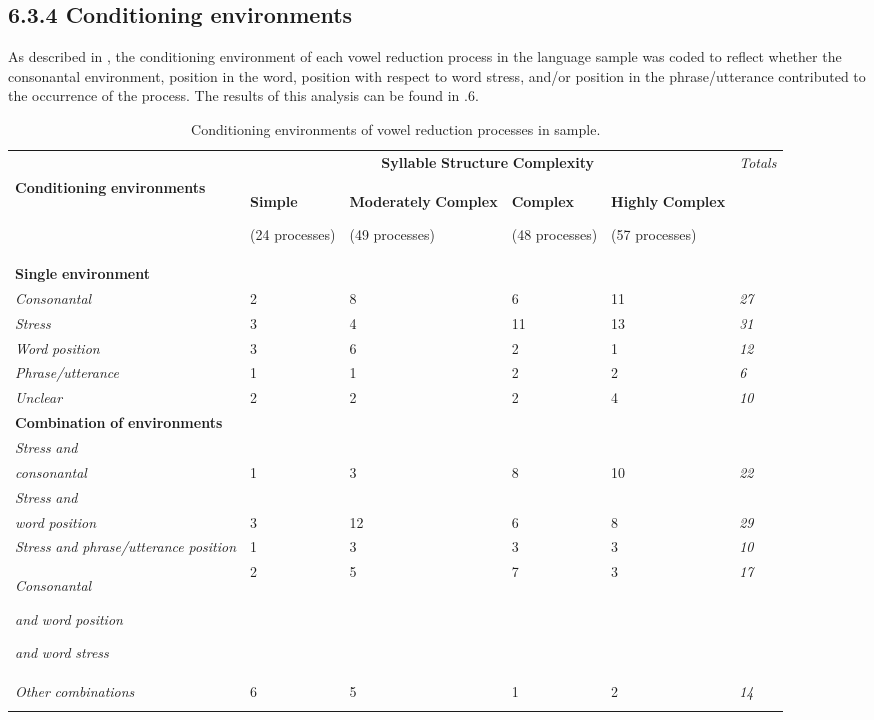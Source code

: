 \subsection{6.3.4 Conditioning environments}

  As described in , the conditioning environment of each vowel reduction process in the language sample was coded to reflect whether the consonantal environment, position in the word, position with respect to word stress, and/or position in the phrase/utterance contributed to the occurrence of the process. The results of this analysis can be found in .6.

\begin{table}
\begin{tabularx}{\textwidth}{XXXXXX}
\lsptoprule
 & \multicolumn{4}{c}{ \textbf{Syllable} \textbf{Structure} \textbf{Complexity}} & \textit{Totals}\\
 \textbf{Conditioning} \textbf{environments} & { \textbf{Simple}}

 (24 processes) & { \textbf{Moderately} \textbf{Complex}}

 (49 processes) & { \textbf{Complex}}

 (48 processes) & { \textbf{Highly} \textbf{Complex}}

 (57 processes) & \\
 \textbf{Single} \textbf{environment} & \multicolumn{5}{c}{}\\
 \textit{Consonantal} & 2 & 8 & 6 & 11 & \textit{27}\\
 \textit{Stress} & 3 & 4 & 11 & 13 & \textit{31}\\
 \textit{Word} \textit{position} & 3 & 6 & 2 & 1 & \textit{12}\\
 \textit{Phrase/utterance} & 1 & 1 & 2 & 2 & \textit{6}\\
 \textit{Unclear} & 2 & 2 & 2 & 4 & \textit{10}\\
 \textbf{Combination} \textbf{of} \textbf{environments} & \multicolumn{5}{c}{}\\
 \textit{Stress} \textit{and} \\
\textit{consonantal} & 1 & 3 & 8 & 10 & \textit{22}\\
 \textit{Stress} \textit{and} \\
\textit{word} \textit{position} & 3 & 12 & 6 & 8 & \textit{29}\\
 \textit{Stress} \textit{and} \textit{phrase/utterance} \textit{position} & 1 & 3 & 3 & 3 & \textit{10}\\
{ \textit{Consonantal} }

{ \textit{and} \textit{word} \textit{position} }

 \textit{and} \textit{word} \textit{stress} & 2 & 5 & 7 & 3 & \textit{17}\\
 \textit{Other} \textit{combinations} & 6 & 5 & 1 & 2 & \textit{14}\\
\lspbottomrule
\end{tabularx}
\caption{\label{6.6}Conditioning environments of vowel reduction processes in sample.}
\end{table}

